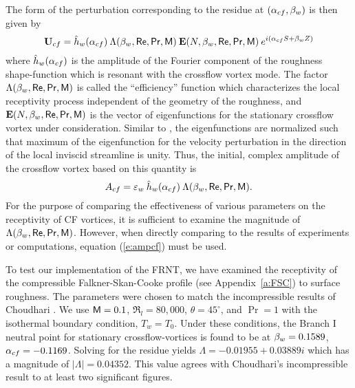 The form of the perturbation corresponding to the residue at $({\alpha_{cf}},{\beta_{w}})$ is
then given by \cite{Goldstein:85}
%
\begin{equation}
  {\bf U}_{cf} = \hat h_w({\alpha_{cf}}) \: \Lambda({\beta_{w}},{\sf Re},{\sf Pr},{\sf M}) \: 
             {\bf E}(N,{\beta_{w}},{\sf Re},{\sf Pr},{\sf M}) \: e^{i({\alpha_{cf}} S + {\beta_{w}} Z)}
\end{equation}
%
where $\hat h_w({\alpha_{cf}})$ is the amplitude of the Fourier component of the
roughness shape-function which is resonant with the crossflow vortex mode. The
factor $\Lambda({\beta_{w}},{\sf Re},{\sf Pr},{\sf M})$ is called the ``efficiency'' function which
characterizes the local receptivity process independent of the geometry of the
roughness, and ${\bf E}(N,{\beta_{w}},{\sf Re},{\sf Pr},{\sf M})$ is the vector of eigenfunctions for the
stationary crossflow vortex under consideration.  Similar to
\cite{Choudhari:94}, the eigenfunctions are normalized such that maximum of
the eigenfunction for the velocity perturbation in the direction of the local
inviscid streamline is unity.  Thus, the initial, complex amplitude of the
crossflow vortex based on this quantity is
%
\begin{equation} \label{e:ampcf}
  A_{cf} = {\varepsilon_w} \: \hat h_w({\alpha_{cf}}) \: \Lambda({\beta_{w}},{\sf Re},{\sf Pr},{\sf M}) .
\end{equation}
%
For the purpose of comparing the effectiveness of various parameters on the
receptivity of CF vortices, it is sufficient to examine the magnitude of
$\Lambda({\beta_{w}},{\sf Re},{\sf Pr},{\sf M})$.  However, when directly comparing to the results of
experiments or computations, equation (\ref{e:ampcf}) must be used.

To test our implementation of the FRNT, we have examined the receptivity of
the compressible Falkner-Skan-Cooke profile (see Appendix~\ref{a:FSC}) to
surface roughness.  The parameters were chosen to match the incompressible
results of Choudhari \cite{Choudhari:94}.  We use ${\sf M}=0.1$, $\Re_l=80,000$,
$\theta=45^\circ$, and $\Pr=1$ with the isothermal boundary condition, $T_w =
T_0$.  Under these conditions, the Branch I neutral point for stationary
crossflow-vortices is found to be at ${\beta_{w}}=0.1589$, ${\alpha_{cf}} = -0.1169$.  Solving
for the residue yields $\Lambda = -0.01955 + 0.03889 i$ which has a magnitude
of $|\Lambda| = 0.04352$.  This value agrees with Choudhari's
\cite{Choudhari:94} incompressible result to at least two significant figures.

